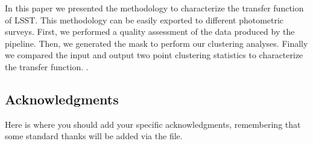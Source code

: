 \documentclass[\docopts]{\docclass}
\begin{document}
In this paper we presented the methodology to characterize the transfer function of LSST. This methodology can be easily exported to different photometric surveys. First, we performed a quality assessment of the data produced by the pipeline. Then, we generated the mask to perform our clustering analyses. Finally we compared the input and output two point clustering statistics to characterize the transfer function. .



\subsection*{Acknowledgments}

Here is where you should add your specific acknowledgments, remembering that some standard thanks will be added via the  file.






\appendix
\end{document}
